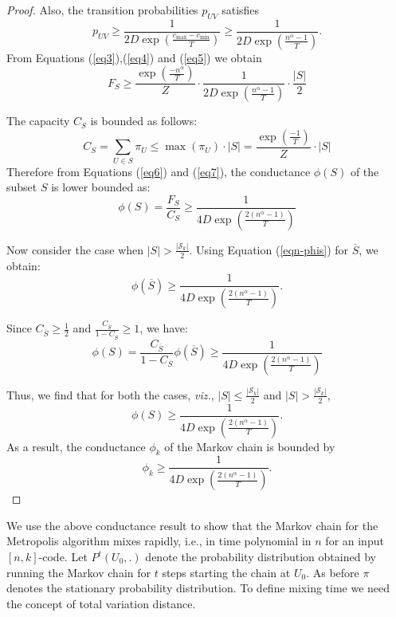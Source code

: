 \documentclass{sig-alternate-2013}
\begin{document}
\begin{proof}
Also, the transition probabilities $p_{UV}$ satisfies
\begin{equation}
  p_{UV} 
  \geq \frac{1}{2D\exp\left({\frac{c_{\max}-c_{\min}}{T}}\right)} 
  \geq \frac{1}{2D\exp\left({\frac{n^\alpha-1}{T}}\right)}.
\label{eq5}
\end{equation}
From Equations (\ref{eq3}),(\ref{eq4}) and (\ref{eq5}) we obtain
\begin{equation}
  F_S 
  \geq \frac{\exp\left({\frac{-n^\alpha}{T}}\right)}{Z} \cdot
  \frac{1}{2D\exp\left({\frac{n^\alpha-1}{T}}\right)} \cdot \frac{|S| }{2}
\label{eq6}
\end{equation}

The capacity $C_S$ is bounded as follows:
\begin{equation}
 C_S = \sum_{U \in S}\pi_U 
     \leq \max(\pi_U) \cdot |S| 
     =     \frac{\exp\left({\frac{-1}{T}}\right)}{Z} \cdot |S|
 \label{eq7}
 \end{equation}
 Therefore from Equations (\ref{eq6}) and (\ref{eq7}), the conductance $\phi(S)$ of the subset $S$ is lower
 bounded as:
 \begin{equation}\label{eqn-phis}
   \phi(S) = \frac{F_S}{C_S} \geq 
   \frac{1}{4D\exp\left({\frac{2(n^\alpha-1)}{T}}\right)}
 \end{equation}

 Now consider the case when $|S| > \frac{|\mathcal{S}_k|}{2}$.  Using
 Equation (\ref{eqn-phis}) for $\overline{S}$, we obtain:
 \[
 \phi(\overline{S}) \geq \frac{1}{4D\exp\left({\frac{2(n^\alpha-1)}{T}}\right)}.
 \]

 Since $C_{\overline{S}} \geq \frac{1}{2}$ and
 $\frac{C_{\overline{S}}}{1-C_{\overline{S}}} \geq 1$, we have:
 \[
 \phi(S)
 =\frac{C_{\overline{S}}}{1-C_{\overline{S}}} \phi(\overline{S}) 
 \geq \frac{1}{4D\exp\left({\frac{2(n^\alpha-1)}{T}}\right)}
 \]

 Thus, we find that for both the cases, \emph{viz.}, $|S| \leq \frac{|
   \mathcal{S}_k|}{2}$ and $|S| > \frac{|\mathcal{S}_k|}{2}$,
 \[
 \phi(S) \geq \frac{1}{4D\exp\left({\frac{2(n^\alpha-1)}{T}}\right)}.
 \]
 As a result, the conductance $\phi_k$ of the Markov chain
 is bounded by
 \[
 \phi_k  \geq \frac{1}{4D\exp\left({\frac{2(n^\alpha-1)}{T}}\right)}.
 \]
\end{proof}



We use the above conductance result to show that the Markov chain for
the Metropolis algorithm mixes rapidly, i.e., in time polynomial in
$n$ for an input $[n,k]$-code. Let $P^t(U_0,.)$ denote the probability
distribution obtained by running the Markov chain for $t$ steps
starting the chain at $U_0$. As before $\pi$ denotes the stationary
probability distribution.  To define mixing time we need the concept
of total variation distance.
\end{document}
